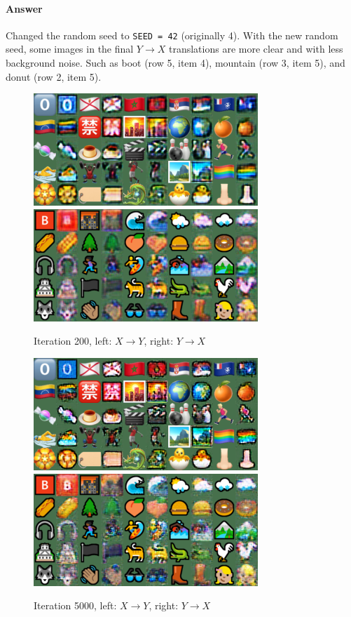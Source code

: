 \documentclass{article}
\begin{document}
	\paragraph{Answer} Changed the random seed to \texttt{SEED = 42} (originally 4). With the new random seed, some images in the final $Y \to X$ translations are more clear and with less background noise. Such as boot (row 5, item 4), mountain (row 3, item 5), and donut (row 2, item 5).
	\begin{figure}[H]
		\centering
		\caption{Iteration 200, left: $X \to Y$, right: $Y \to X$}
		\includegraphics[width=0.45\linewidth]{./samples_cyclegan_Q2_seed42/sample-000200-X-Y.png}
		\includegraphics[width=0.45\linewidth]{./samples_cyclegan_Q2_seed42/sample-000200-Y-X.png}
	\end{figure}
	\begin{figure}[H]
		\centering
		\caption{Iteration 5000, left: $X \to Y$, right: $Y \to X$}
		\includegraphics[width=0.45\linewidth]{./samples_cyclegan_Q2_seed42/sample-005000-X-Y.png}
		\includegraphics[width=0.45\linewidth]{./samples_cyclegan_Q2_seed42/sample-005000-Y-X.png}
	\end{figure}
\end{document}
